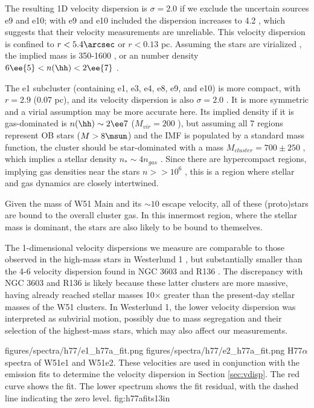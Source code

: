 The resulting 1D velocity dispersion is $\sigma=2.0$ \kms if we exclude
the uncertain sources e9
and e10; with e9 and e10 included the dispersion increases to 4.2 \kms, which
suggests that their velocity
measurements  are unreliable.  This velocity dispersion is confined to
$r<5.4\arcsec$ or $r<0.13$ pc.  Assuming the stars are virialized \citep[which
is a good assumption if the stellar mass is dominant;][]{Kruijssen2012b}, the
implied mass is 350-1600 \msun, or an \hh number density $6\ee{5} < n(\hh) <
2\ee{7}$ \percc.

The e1 subcluster (containing e1, e3, e4, e8, e9, and e10)  is more compact,
with $r=2.9$ \arcsec (0.07 pc), and its
velocity dispersion is also $\sigma=2.0$ \kms.  It is more symmetric and a virial
assumption may be more accurate here.  Its implied density if it is gas-dominated
is $n(\hh)\sim2\ee7$ \percc ($M_{vir}=200$ \msun), but assuming all 7 \hchii
regions represent OB stars ($M>8\msun$) and the IMF is populated by a standard
\citet{Kroupa2001a} mass function, the cluster should be star-dominated with a
mass $M_{cluster}=700\pm250$ \msun, which implies a stellar density $n_* \sim 4
n_{gas}$ \citep[similar to the mass ratio obtained in the simulations
of][]{Kruijssen2012b}.  Since there are hypercompact \hii regions,
implying gas densities near the stars $n>>10^6$ \percc, this is a region where
stellar and gas dynamics are closely intertwined.

Given the mass of W51 Main and its $\sim10$ \kms escape velocity, all of these
(proto)stars are bound to the overall cluster gas.  In this innermost region,
where the stellar mass is dominant, the stars are also likely to be bound to
themselves.

The 1-dimensional velocity dispersions we measure are comparable to those
observed in the high-mass stars in Westerlund 1 \citep{Cottaar2012a}, but
substantially smaller than the 4-6 \kms velocity dispersion found in NGC 3603
and R136 \citep{Rochau2010a, Pang2013a, Henault-Brunet2012a}.  The discrepancy
with NGC 3603 and R136 is likely because these latter clusters are more
massive, having already reached stellar masses 10$\times$ greater than the
present-day stellar masses of the W51 clusters.  In Westerlund 1, the lower
velocity dispersion was interpreted as subvirial motion, possibly due to mass
segregation and their selection of the highest-mass stars, which may also
affect our measurements.

\FigureTwo
{figures/spectra/h77/e1_h77a_fit.png}
{figures/spectra/h77/e2_h77a_fit.png}
{H77$\alpha$ spectra of W51e1 and W51e2.  These velocities are used in
conjunction with the \formaldehyde emission fits to determine the velocity
dispersion in Section \ref{sec:vdisp}.
The red curve shows the fit.  The lower spectrum shows the fit residual, with
the dashed line indicating the zero level.  
}
{fig:h77afits}{1}{3in}

